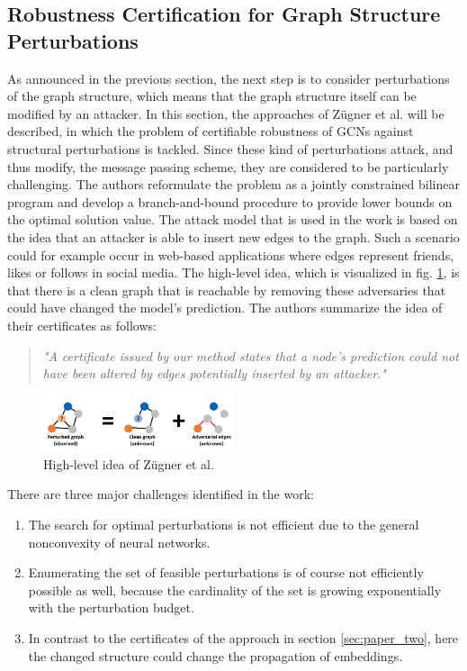 \documentclass[a4paper,preprint]{sig-alternate}
\begin{document}
\subsection{Robustness Certification for Graph Structure Perturbations}
\label{sec:paper_three}

As announced in the previous section, the next step is to consider perturbations of the graph structure,
which means that the graph structure itself can be modified by an attacker.
In this section, the approaches of Zügner et al. \cite{10.1145/3394486.3403217} will be described, in which the
problem of certifiable robustness of GCNs against structural perturbations is tackled. 
Since these kind of perturbations attack, and thus modify, the message passing scheme, they are considered to be particularly challenging. \cite{10.1145/3394486.3403217} 
The authors reformulate the problem as a jointly constrained bilinear program and develop a branch-and-bound procedure 
to provide lower bounds on the optimal solution value. The attack model that is used in the work is based on the idea that an attacker 
is able to insert new edges to the graph. Such a scenario could for example occur in web-based applications where edges represent friends, 
likes or follows in social media. \cite{10.1145/3394486.3403217}
The high-level idea, which is visualized in fig. \ref{fig:high_level}, is that there is a clean graph that is reachable by removing
these adversaries that could have changed the model's prediction.
The authors summarize the idea of their certificates as follows:
\begin{quote}
    \emph{"A certificate issued by our method states that a node's prediction could not have been altered by edges potentially
    inserted by an attacker."} \cite{10.1145/3394486.3403217}
\end{quote}
\begin{figure}[h]
    \centering
    \includegraphics[width=0.5\textwidth]{img/high_level_graph_pert.png}
    \caption{High-level idea of Zügner et al. \cite{10.1145/3394486.3403217}}
    \label{fig:high_level}
\end{figure}
There are three major challenges identified in the work:
\begin{enumerate}
    \item The search for optimal perturbations is not efficient due to the general nonconvexity of neural networks. \label{enum:challenge_one}
    \item Enumerating the set of feasible perturbations is of course not efficiently possible as well, because the cardinality of the
    set is growing exponentially with the perturbation budget. \label{enum:challenge_two}
    \item In contrast to the certificates of the approach in section \ref{sec:paper_two}, here the changed structure could change 
    the propagation of embeddings. \label{enum:challenge_three}
\end{enumerate}
\end{document}

